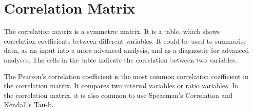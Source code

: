 \section{Correlation Matrix} %

The correlation matrix is a symmetric matrix. It is a table, which shows correlation coefficients between different variables. It could be used to summarise data, as an input into a more advanced analysis, and as a diagnostic for advanced analyses. The cells in the table indicate the correlation between two variables.

The Pearson's correlation coefficient is the most common correlation coefficient in the correlation matrix. It compares two interval variables or ratio variables. In the correlation matrix, it is also common to use Spearman’s Correlation and Kendall’s Tau-b.
